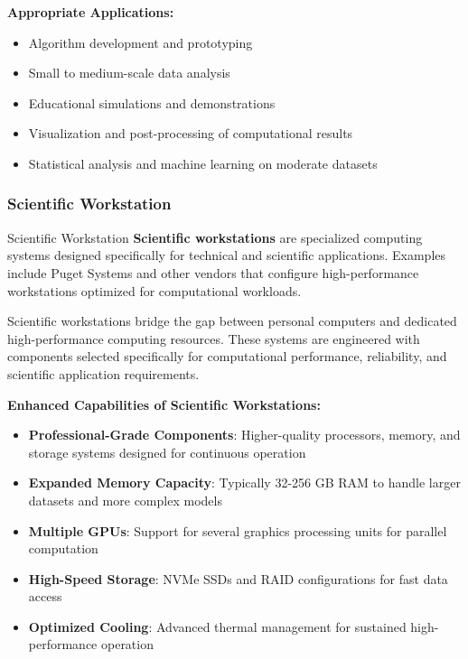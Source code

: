 \textbf{Appropriate Applications:}
\begin{itemize}
    \item Algorithm development and prototyping
    \item Small to medium-scale data analysis
    \item Educational simulations and demonstrations
    \item Visualization and post-processing of computational results
    \item Statistical analysis and machine learning on moderate datasets
\end{itemize}

\subsubsection{Scientific Workstation}

\begin{conceptcard}{Scientific Workstation}
\textbf{Scientific workstations} are specialized computing systems designed specifically for technical and scientific applications. Examples include Puget Systems and other vendors that configure high-performance workstations optimized for computational workloads.
\end{conceptcard}

Scientific workstations bridge the gap between personal computers and dedicated high-performance computing resources. These systems are engineered with components selected specifically for computational performance, reliability, and scientific application requirements.

\textbf{Enhanced Capabilities of Scientific Workstations:}
\begin{itemize}
    \item \textbf{Professional-Grade Components}: Higher-quality processors, memory, and storage systems designed for continuous operation
    \item \textbf{Expanded Memory Capacity}: Typically 32-256 GB RAM to handle larger datasets and more complex models
    \item \textbf{Multiple GPUs}: Support for several graphics processing units for parallel computation
    \item \textbf{High-Speed Storage}: NVMe SSDs and RAID configurations for fast data access
    \item \textbf{Optimized Cooling}: Advanced thermal management for sustained high-performance operation
\end{itemize}

